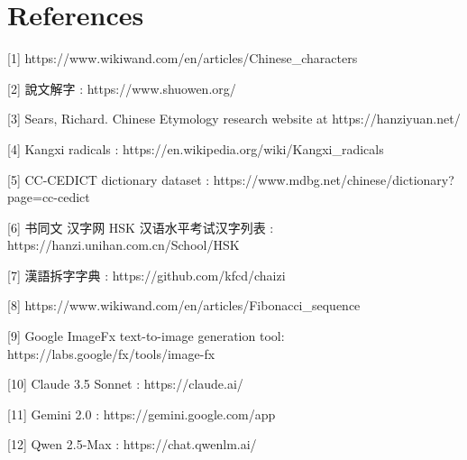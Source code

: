 \documentclass[11pt,letterpaper]{article}
\begin{document}
\section{References}\label{references}

{[}1{]} https://www.wikiwand.com/en/articles/Chinese\_characters

{[}2{]} 說文解字 : https://www.shuowen.org/

{[}3{]} Sears, Richard. Chinese Etymology research website at
https://hanziyuan.net/

{[}4{]} Kangxi radicals : https://en.wikipedia.org/wiki/Kangxi\_radicals

{[}5{]} CC-CEDICT dictionary dataset :
https://www.mdbg.net/chinese/dictionary?page=cc-cedict

{[}6{]} 书同文 汉字网 HSK 汉语水平考试汉字列表 :
https://hanzi.unihan.com.cn/School/HSK

{[}7{]} 漢語拆字字典 : https://github.com/kfcd/chaizi

{[}8{]} https://www.wikiwand.com/en/articles/Fibonacci\_sequence

{[}9{]} Google ImageFx text-to-image generation tool:
https://labs.google/fx/tools/image-fx

{[}10{]} Claude 3.5 Sonnet : https://claude.ai/

{[}11{]} Gemini 2.0 : https://gemini.google.com/app

{[}12{]} Qwen 2.5-Max : https://chat.qwenlm.ai/
\end{document}
